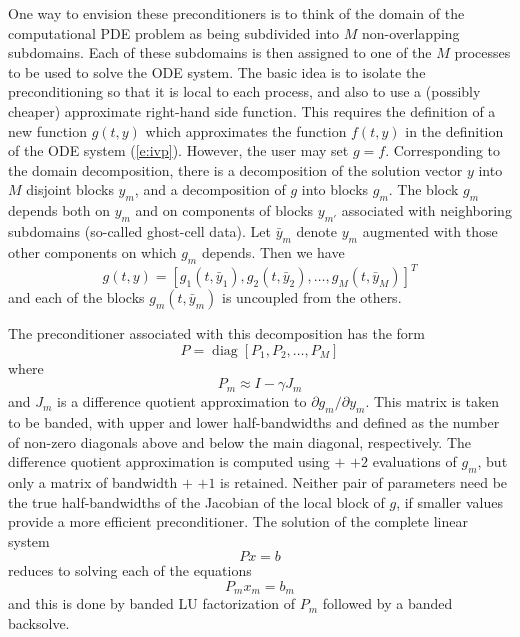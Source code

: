 One way to envision these preconditioners is to think of the domain of
the computational PDE problem as being subdivided into $M$ non-overlapping
subdomains.  Each of these subdomains is then assigned to one of the
$M$ processes to be used to solve the ODE system. The basic idea is
to isolate the preconditioning so that it is local to each process,
and also to use a (possibly cheaper) approximate right-hand side
function. This requires the definition of a new function $g(t,y)$
which approximates the function $f(t, y)$ in the definition of the ODE
system (\ref{e:ivp}). However, the user may set $g = f$.  Corresponding
to the domain decomposition, there is a decomposition of the solution
vector $y$ into $M$ disjoint blocks $y_m$, and a decomposition of $g$
into blocks $g_m$.  The block $g_m$ depends both on $y_m$ and on
components of blocks $y_{m'}$ associated with neighboring subdomains
(so-called ghost-cell data).  Let $\bar{y}_m$ denote $y_m$ augmented
with those other components on which $g_m$ depends.  Then we have
\begin{equation}
  g(t,y) = [g_1(t,\bar{y}_1), g_2(t,\bar{y}_2), \ldots, g_M(t,\bar{y}_M)]^T
\end{equation}
and each of the blocks $g_m(t, \bar{y}_m)$ is uncoupled from the others.

The preconditioner associated with this decomposition has the form
\begin{equation}
  P= \operatorname{diag}[P_1, P_2, \ldots, P_M]
\end{equation}
where
\begin{equation}
  P_m \approx I - \gamma J_m
\end{equation}
and $J_m$ is a difference quotient approximation to
$\partial g_m/\partial y_m$. This matrix is taken to be banded, with
upper and lower half-bandwidths  and  defined as
the number of non-zero diagonals above and below the main diagonal,
respectively. The difference quotient approximation is computed using
 $+$  $+ 2$ evaluations of $g_m$, but only a matrix
of bandwidth  $+$  $+ 1$ is retained.
Neither pair of parameters need be the true half-bandwidths of the Jacobian of the
local block of $g$, if smaller values provide a more efficient
preconditioner. The solution of the complete linear system
\begin{equation}
  Px = b
\end{equation}
reduces to solving each of the equations
\begin{equation}
  P_m x_m = b_m
\end{equation}
and this is done by banded LU factorization of $P_m$ followed by a banded
backsolve.

